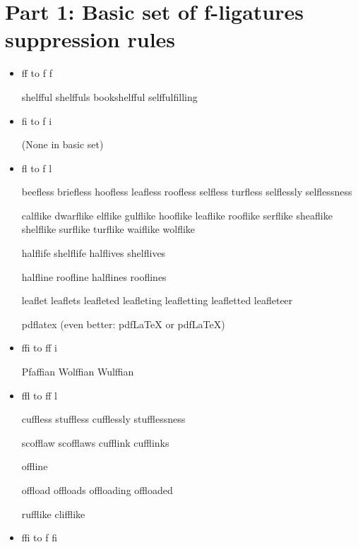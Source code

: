 


\section*{Part 1: Basic set of f-ligatures suppression rules}


\begin{itemize}

\item ff to f\kern0pt f

shelfful shelffuls bookshelfful selffulfilling



\item fi to f\kern0pt i

(None in basic set)



\item fl to f\kern0pt l

beefless briefless hoofless leafless roofless selfless turfless selflessly selflessness

calflike dwarflike elflike gulflike hooflike leaflike rooflike serflike sheaflike shelflike surflike turflike waiflike wolflike

halflife shelflife
halflives shelflives

halfline roofline
halflines rooflines

leaflet leaflets leafleted leafleting leafletting leafletted leafleteer

pdflatex (even better: pdfLaTeX or pdf\LaTeX)



\item ffi to ff\kern0pt i

Pfaffian Wolffian Wulffian



\item ffl to ff\kern0pt l

cuffless stuffless cufflessly stufflessness

scofflaw scofflaws cufflink cufflinks

offline

offload offloads offloading offloaded

rufflike clifflike



\item ffi to f\kern0pt fi


\end{itemize}
